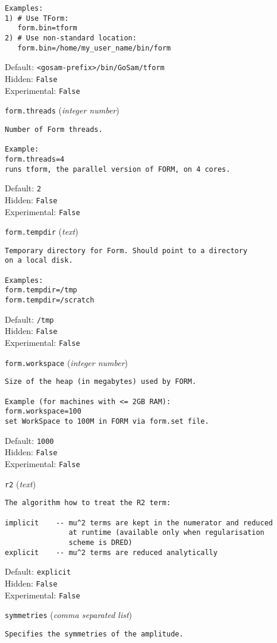 \begin{basedescript}{\desclabelstyle{\pushlabel}}
\begin{verbatim}
Examples:
1) # Use TForm:
   form.bin=tform
2) # Use non-standard location:
   form.bin=/home/my_user_name/bin/form
\end{verbatim}
Default: \verb|<gosam-prefix>/bin/GoSam/tform|
\\Hidden: \verb|False|
\\Experimental: \verb|False|
\\\item[\colorbox{gray!30}{\texttt{form.threads}}] (\textit{integer number})
\begin{verbatim}
Number of Form threads.

Example:
form.threads=4
runs tform, the parallel version of FORM, on 4 cores.
\end{verbatim}
Default: \verb|2|
\\Hidden: \verb|False|
\\Experimental: \verb|False|
\\\item[\colorbox{gray!30}{\texttt{form.tempdir}}] (\textit{text})
\begin{verbatim}
Temporary directory for Form. Should point to a directory
on a local disk.

Examples:
form.tempdir=/tmp
form.tempdir=/scratch
\end{verbatim}
Default: \verb|/tmp|
\\Hidden: \verb|False|
\\Experimental: \verb|False|
\\\item[\colorbox{gray!30}{\texttt{form.workspace}}] (\textit{integer number})
\begin{verbatim}
Size of the heap (in megabytes) used by FORM.

Example (for machines with <= 2GB RAM):
form.workspace=100
set WorkSpace to 100M in FORM via form.set file.
\end{verbatim}
Default: \verb|1000|
\\Hidden: \verb|False|
\\Experimental: \verb|False|
\\\item[\colorbox{gray!30}{\texttt{r2}}] (\textit{text})
\begin{verbatim}
The algorithm how to treat the R2 term:

implicit    -- mu^2 terms are kept in the numerator and reduced
               at runtime (available only when regularisation
               scheme is DRED)
explicit    -- mu^2 terms are reduced analytically
\end{verbatim}
Default: \verb|explicit|
\\Hidden: \verb|False|
\\Experimental: \verb|False|
\\\item[\colorbox{gray!30}{\texttt{symmetries}}] (\textit{comma separated list})
\begin{verbatim}
Specifies the symmetries of the amplitude.


\end{verbatim}
\end{basedescript}
